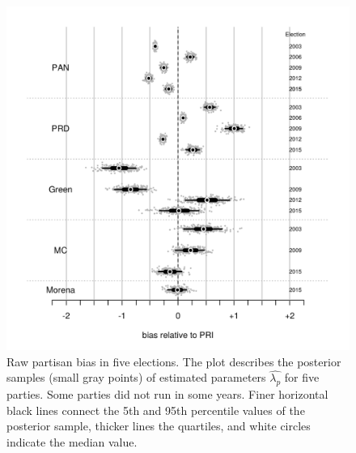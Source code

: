 \documentclass[letter,12pt]{article}
\newcommand{\mc}{\multicolumn}
\begin{document}
{\begin{figure}
\begin{center}
    \includegraphics[width=.9\columnwidth]{bias200615d0v.pdf} 
  \caption{Raw partisan bias in five elections. The plot describes the posterior samples (small gray points) of estimated parameters $\hat{\lambda_p}$ for five parties. Some parties did not run in some years. Finer horizontal black lines connect the 5th and 95th percentile values of the posterior sample, thicker lines the quartiles, and white circles indicate the median value.}\label{F:posterior_s0s3}
\end{center}
\end{figure}

}
\end{document}

